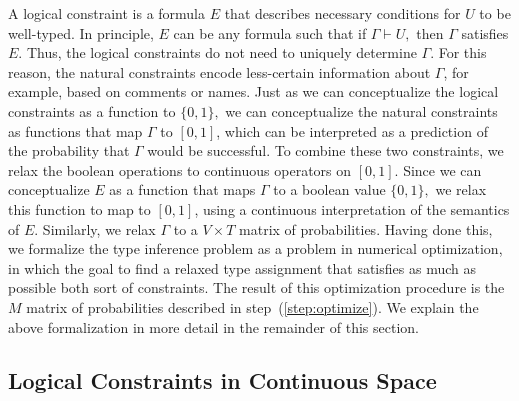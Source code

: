 \documentclass[sigplan,10pt,anonymous]{acmart} %
\theoremstyle{plain}
\theoremstyle{remark}
\theoremstyle{definition}
\begin{document}
A logical constraint is a formula $E$ that describes
necessary conditions for $U$ to be well-typed. In principle,
$E$ can be any formula such that if $\Gamma \vdash U,$
then $\Gamma$ satisfies $E.$
Thus, the logical constraints
do not need to uniquely determine $\Gamma$.
For this reason, the natural constraints
encode less-certain information about $\Gamma$,
for example, based on comments or names.
Just as we can conceptualize the logical
constraints as a function to $\{0, 1\},$
we can conceptualize the natural constraints as functions
that map $\Gamma$ to $[0, 1]$, which can be interpreted
as a prediction of the probability that $\Gamma$ would
be successful. To combine these two constraints, we relax the boolean operations to continuous operators on $[0, 1]$.
Since we can conceptualize $E$ as a function
that maps $\Gamma$ to a boolean value $\{0, 1\},$
we relax this function to map to $[0,1]$, using
a continuous interpretation of the semantics of $E.$
Similarly, we relax $\Gamma$ to a $V \times T$ matrix of probabilities.
Having done this, we
formalize the type inference problem as a problem in
numerical optimization, in which the goal to find a relaxed type
assignment
that satisfies as much as possible both sort of constraints.
The result of this optimization procedure is the
$M$ matrix of probabilities described in step~(\ref{step:optimize}).
We explain the above formalization
in more detail in the remainder of this section.

\subsection{Logical Constraints in Continuous Space}\label{ssec:logcon}
\end{document}
